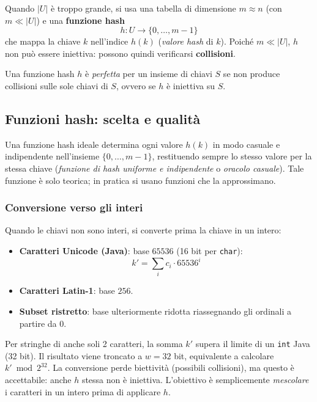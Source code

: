 Quando $|U|$ è troppo grande, si usa una tabella di dimensione $m \approx n$
(con $m \ll |U|$) e una \textbf{funzione hash}
\[
h : U \to \{0, \ldots, m-1\}
\]
che mappa la chiave $k$ nell'indice $h(k)$ (\emph{valore hash} di $k$).
Poiché $m \ll |U|$, $h$ non può essere iniettiva: possono quindi verificarsi
\textbf{collisioni}.

\begin{definizione}
	Una funzione hash $h$ è \emph{perfetta} per un insieme di chiavi $S$ se
	non produce collisioni sulle sole chiavi di $S$, ovvero se $h$ è iniettiva
	su $S$.
\end{definizione}

\subsection{Funzioni hash: scelta e qualità}

\begin{softnote}
	Una funzione hash ideale determina ogni valore $h(k)$ in modo casuale e
	indipendente nell'insieme $\{0,\ldots,m-1\}$, restituendo sempre lo stesso
	valore per la stessa chiave (\emph{funzione di hash uniforme e indipendente}
	o \emph{oracolo casuale}). Tale funzione è solo teorica; in pratica si usano
	funzioni che la approssimano.
\end{softnote}

\subsubsection{Conversione verso gli interi}

Quando le chiavi non sono interi, si converte prima la chiave in un intero:

\begin{itemize}
	\item \textbf{Caratteri Unicode (Java)}: base $65536$ (16 bit per
	\texttt{char}):
	\[
	k' = \sum_{i} c_i \cdot 65536^i
	\]
	\item \textbf{Caratteri Latin-1}: base $256$.
	\item \textbf{Subset ristretto}: base ulteriormente ridotta riassegnando
	gli ordinali a partire da $0$.
\end{itemize}

\begin{nota}
	Per stringhe di anche soli 2 caratteri, la somma $k'$ supera il limite di
	un \texttt{int} Java (32 bit). Il risultato viene troncato a $w = 32$ bit,
	equivalente a calcolare $k' \bmod 2^{32}$. La conversione perde biettività
	(possibili collisioni), ma questo è accettabile: anche $h$ stessa non è
	iniettiva. L'obiettivo è semplicemente \emph{mescolare} i caratteri in un
	intero prima di applicare $h$.
\end{nota}

